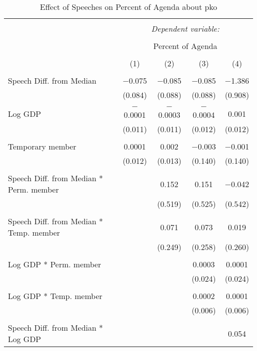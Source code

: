 
\begin{table}[!htbp] \centering 
  \caption{Effect of Speeches on Percent of Agenda about pko} 
  \label{} 
\begin{tabular}{@{\extracolsep{5pt}}lcccc} 
\\[-1.8ex]\hline 
\hline \\[-1.8ex] 
 & \multicolumn{4}{c}{\textit{Dependent variable:}} \\ 
\cline{2-5} 
\\[-1.8ex] & \multicolumn{4}{c}{Percent of Agenda} \\ 
\\[-1.8ex] & (1) & (2) & (3) & (4)\\ 
\hline \\[-1.8ex] 
 Speech Diff. from Median & $-$0.075 & $-$0.085 & $-$0.085 & $-$1.386 \\ 
  & (0.084) & (0.088) & (0.088) & (0.908) \\ 
  & & & & \\ 
 Log GDP & $-$0.0001 & $-$0.0003 & $-$0.0004 & 0.001 \\ 
  & (0.011) & (0.011) & (0.012) & (0.012) \\ 
  & & & & \\ 
 Temporary member & 0.0001 & 0.002 & $-$0.003 & $-$0.001 \\ 
  & (0.012) & (0.013) & (0.140) & (0.140) \\ 
  & & & & \\ 
 Speech Diff. from Median * Perm. member &  & 0.152 & 0.151 & $-$0.042 \\ 
  &  & (0.519) & (0.525) & (0.542) \\ 
  & & & & \\ 
 Speech Diff. from Median * Temp. member &  & 0.071 & 0.073 & 0.019 \\ 
  &  & (0.249) & (0.258) & (0.260) \\ 
  & & & & \\ 
 Log GDP * Perm. member &  &  & 0.0003 & 0.0001 \\ 
  &  &  & (0.024) & (0.024) \\ 
  & & & & \\ 
 Log GDP * Temp. member &  &  & 0.0002 & 0.0001 \\ 
  &  &  & (0.006) & (0.006) \\ 
  & & & & \\ 
 Speech Diff. from Median * Log GDP &  &  &  & 0.054 \\ 

\end{tabular}
\end{table}
